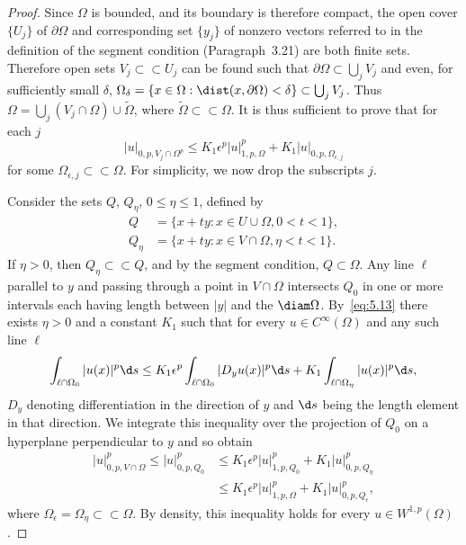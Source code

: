 \begin{proof}
  Since $\Omega$ is bounded, and its boundary is therefore compact, the open
  cover $\{U_j\}$ of $\partial\Omega$ and corresponding set $\{y_j\}$ of
  nonzero vectors referred to in the definition of the segment condition
  (Paragraph~3.21) are both finite sets. Therefore open sets $V_j\subset\subset U_j$
  can be found such that $\partial\Omega\subset\bigcup_j V_j$ and even,
  for sufficiently small $\delta$, $\Omega_\delta = \{x\in\Omega : \dist(x,\partial\Omega)<\delta\}
  \subset \bigcup_j V_j$. Thus $\Omega = \bigcup_j (V_j\cap\Omega)\cup\tilde{\Omega}$,
  where $\tilde{\Omega}\subset\subset\Omega$. It is thus sufficient
  to prove that for each $j$
  \[ |u|_{0,p,V_j\cap\Omega^p} \leq K_1 \epsilon^p |u|_{1,p,\Omega}^p
      + K_1 |u|_{0,p,\Omega_{\epsilon,j}} \]
  for some $\Omega_{\epsilon,j}\subset\subset\Omega$. For simplicity,
  we now drop the subscripts $j$.

  Consider the sets $Q$, $Q_\eta$, $0\leq\eta\leq 1$, defined by
  \begin{align*}
    Q & = \{x+ty : x\in U\cup\Omega, 0<t<1\}, \\
    Q_\eta & = \{x+ty : x\in V\cap\Omega, \eta<t<1\}.
  \end{align*}
  If $\eta>0$, then $Q_\eta\subset\subset Q$, and by the segment condition,
  $Q\subset\Omega$. Any line $\ell$ parallel to $y$ and passing through
  a point in $V\cap\Omega$ intersects $Q_0$ in one or more intervals
  each having length between $|y|$ and the $\diam\Omega$. By~\eqref{eq:5.13}
  there exists $\eta>0$ and a constant $K_1$ such that for every $u\in C^\infty(\Omega)$
  and any such line $\ell$
  \[ \int_{\ell\cap\Omega_0} |u(x)|^p \d s
      \leq K_1 \epsilon^p \int_{\ell\cap\Omega_0} |D_y u(x)|^p \d s
      + K_1 \int_{\ell\cap\Omega_\eta} |u(x)|^p \d s, \]
  $D_y$ denoting differentiation in the direction of $y$ and $\d s$ being the
  length element in that direction. We integrate this inequality over the
  projection of $Q_0$ on a hyperplane perpendicular to $y$ and so obtain
  \begin{align*}
    |u|_{0,p,V\cap\Omega}^p \leq |u|_{0,p,Q_0}^p
    & \leq K_1 \epsilon^p |u|_{1,p,Q_0}^p + K_1 |u|_{0,p,Q_\eta}^p \\
    & \leq K_1 \epsilon^p |u|_{1,p,\Omega}^p + K_1 |u|_{0,p,Q_\epsilon}^p,
  \end{align*}
  where $\Omega_\epsilon = \Omega_\eta \subset\subset\Omega$.
  By density, this inequality holds for every $u\in W^{1,p}(\Omega)$.
\end{proof}


